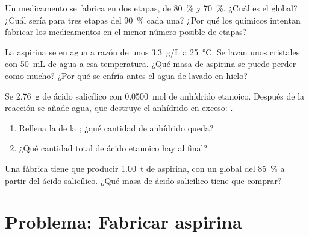 \begin{exercise}[$\star\star\star$]\label{exo:g10:synthesis-yield:12}
Un medicamento se fabrica en dos etapas, de 
\qty{80}{\percent} y \qty{70}{\percent}. ¿Cuál es el  global?
¿Cuál sería para tres etapas del \qty{90}{\percent} cada una? ¿Por qué
los químicos intentan fabricar los medicamentos en el menor número
posible de etapas?
\end{exercise}

\begin{exercise}[$\star\star\star$]\label{exo:g10:synthesis-yield:13}
La aspirina se  en agua a razón de unos \qty{3.3}{g/L} a
\qty{25}{\celsius}. Se lavan unos cristales con \qty{50}{mL} de agua a
esa temperatura. ¿Qué masa de aspirina se puede perder como mucho? ¿Por
qué se enfría antes el agua de lavado en hielo?
\end{exercise}

\begin{exercise}[$\star\star\star$]\label{exo:g10:synthesis-yield:14}
Se  \qty{2.76}{g} de ácido salicílico con \qty{0.0500}{mol} de
anhídrido etanoico. Después de la reacción se añade agua, que destruye
el anhídrido en exceso: .
\begin{enumerate}
  \item Rellena la  de la ; ¿qué cantidad de
        anhídrido queda?
  \item ¿Qué cantidad total de ácido etanoico hay al final?
\end{enumerate}
\end{exercise}

\begin{exercise}[$\star\star\star$]\label{exo:g10:synthesis-yield:15}
Una fábrica tiene que producir \qty{1.00}{t} de aspirina, con un
 global del \qty{85}{\percent} a partir del ácido salicílico.
¿Qué masa de ácido salicílico tiene que comprar?
\end{exercise}

\section{Problema: Fabricar aspirina}

